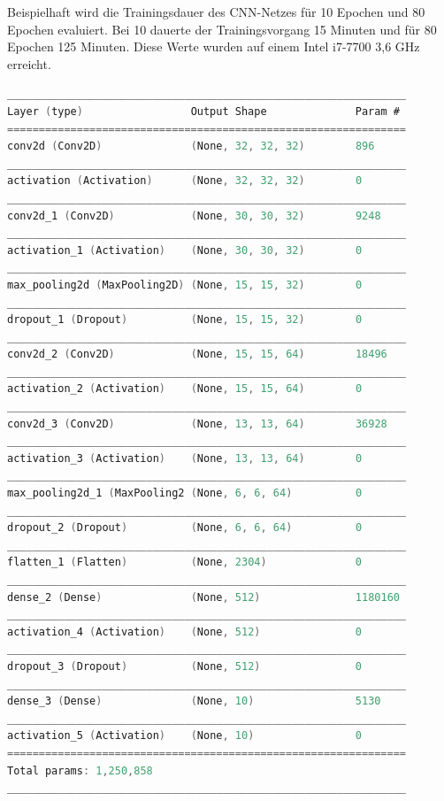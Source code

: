 Beispielhaft wird die Trainingsdauer des CNN-Netzes für 10 Epochen und 80 Epochen evaluiert. Bei 10 dauerte der Trainingsvorgang 15 Minuten und für 80 Epochen 125 Minuten. Diese Werte wurden auf einem Intel i7-7700 3,6 GHz erreicht. 

{\small
\begin{lstlisting}[language=C,caption=Exakte Modell-Architektur des Convolutional Neural Network ,label=auflistung_cnn]
_______________________________________________________________
Layer (type)                 Output Shape              Param #
===============================================================
conv2d (Conv2D)              (None, 32, 32, 32)        896
_______________________________________________________________
activation (Activation)      (None, 32, 32, 32)        0
_______________________________________________________________
conv2d_1 (Conv2D)            (None, 30, 30, 32)        9248
_______________________________________________________________
activation_1 (Activation)    (None, 30, 30, 32)        0
_______________________________________________________________
max_pooling2d (MaxPooling2D) (None, 15, 15, 32)        0
_______________________________________________________________
dropout_1 (Dropout)          (None, 15, 15, 32)        0
_______________________________________________________________
conv2d_2 (Conv2D)            (None, 15, 15, 64)        18496
_______________________________________________________________
activation_2 (Activation)    (None, 15, 15, 64)        0
_______________________________________________________________
conv2d_3 (Conv2D)            (None, 13, 13, 64)        36928
_______________________________________________________________
activation_3 (Activation)    (None, 13, 13, 64)        0
_______________________________________________________________
max_pooling2d_1 (MaxPooling2 (None, 6, 6, 64)          0
_______________________________________________________________
dropout_2 (Dropout)          (None, 6, 6, 64)          0
_______________________________________________________________
flatten_1 (Flatten)          (None, 2304)              0
_______________________________________________________________
dense_2 (Dense)              (None, 512)               1180160
_______________________________________________________________
activation_4 (Activation)    (None, 512)               0
_______________________________________________________________
dropout_3 (Dropout)          (None, 512)               0
_______________________________________________________________
dense_3 (Dense)              (None, 10)                5130
_______________________________________________________________
activation_5 (Activation)    (None, 10)                0
===============================================================
Total params: 1,250,858
_______________________________________________________________
\end{lstlisting}
}

